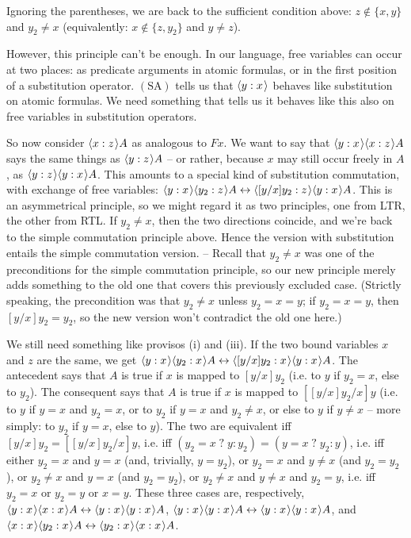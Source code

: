 \documentclass[11pt]{woarticle}
\theoremstyle{break}
\theoremstyle{nonumberplain}
\newcommand{\1}{\;\,|\;\,}
\renewcommand{\t}[1]{\ensuremath{\langle #1  \makebox[.2ex]{}\rangle}}
\newcommand{\T}[1]{\ensuremath{(\mathrm{ #1})}}
\begin{document}
{  Ignoring the parentheses, we are back to the sufficient condition
  above: $z\not\in\{x,y\}$ and $y_2\not=x$ (equivalently: $x\not\in
  \{z,y_2\}$ and $y\not=z$).

  However, this principle can't be enough. In our language, free
  variables can occur at two places: as predicate arguments in atomic
  formulas, or in the first position of a substitution
  operator. \T{SA} tells us that $\t{y:x}$ behaves like substitution
  on atomic formulas. We need something that tells us it behaves like
  this also on free variables in substitution operators. 

  So now consider $\t{x:z}A$ as analogous to $Fx$. We want to say that
  $\t{y:x}\t{x:z}A$ says the same things as $\t{y:z}A$ -- or rather,
  because $x$ may still occur freely in $A$, as
  $\t{y:z}\t{y:x}A$. This amounts to a special kind of substitution
  commutation, with exchange of free variables: $\t{y:x}\t{y_2:z}A
  \leftrightarrow \t{[y/x]y_2:z}\t{y:x}A$. This is an asymmetrical
  principle, so we might regard it as two principles, one from LTR,
  the other from RTL. If $y_2\not=x$, then the two directions
  coincide, and we're back to the simple commutation principle
  above. Hence the version with substitution entails the simple
  commutation version. -- Recall that $y_2\not=x$ was one of the
  preconditions for the simple commutation principle, so our new
  principle merely adds something to the old one that covers this
  previously excluded case. (Strictly speaking, the precondition was
  that $y_2\not=x$ unless $y_2=x=y$; if $y_2=x=y$, then $[y/x]y_2 =
  y_2$, so the new version won't contradict the old one here.)

  We still need something like provisos (i) and (iii). If the two
  bound variables $x$ and $z$ are the same, we get $\t{y:x}\t{y_2:x}A
  \leftrightarrow \t{[y/x]y_2:x}\t{y:x}A$. The antecedent says that
  $A$ is true if $x$ is mapped to $[y/x]y_2$ (i.e. to $y$ if $y_2=x$,
  else to $y_2$). The consequent says that $A$ is true if $x$ is
  mapped to $[[y/x]y_2/x]y$ (i.e. to $y$ if $y=x$ and $y_2=x$, or to
  $y_2$ if $y=x$ and $y_2\not=x$, or else to $y$ if $y\not=x$ -- more
  simply: to $y_2$ if $y=x$, else to $y$). The two are equivalent iff
  $[y/x]y_2 = [[y/x]y_2/x]y$, i.e. iff $(y_2\!=\!x \;?\; y : y_2) =
  (y\!=\!x \;?\; y_2 : y)$, i.e. iff either $y_2=x$ and $y=x$ (and,
  trivially, $y=y_2$), or $y_2=x$ and $y\not=x$ (and $y_2 = y_2$), or
  $y_2\not=x$ and $y=x$ (and $y_2=y_2$), or $y_2\not=x$ and $y\not=x$
  and $y_2=y$, i.e. iff $y_2=x$ or $y_2=y$ or $x=y$. These three cases
  are, respectively, $\t{y:x}\t{x:x}A \leftrightarrow
  \t{y:x}\t{y:x}A$, $\t{y:x}\t{y:x}A \leftrightarrow \t{y:x}\t{y:x}A$,
  and $\t{x:x}\t{y_2:x}A \leftrightarrow \t{y_2:x}\t{x:x}A$.

}
\end{document}
